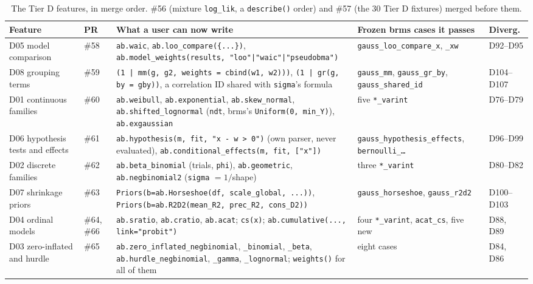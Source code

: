 \documentclass[11pt]{article}
\newcommand{\code}[1]{\texttt{#1}}
\begin{document}
\begin{table}[tbp]
\small
\begin{center}\begin{tabular}{@{}>{\raggedright\arraybackslash}p{}>{\raggedright\arraybackslash}p{}>{\raggedright\arraybackslash}p{}>{\raggedright\arraybackslash}p{}>{\raggedright\arraybackslash}p{}@{}}
\toprule
Feature & PR & What a user can now write & Frozen brms cases it passes & Diverg. \\
\midrule
D05 model comparison & \#58 & \code{ab.waic}, \code{ab.loo\_compare(\{...\})}, \code{ab.model\_weights(results, "loo"|"waic"|"pseudobma")} & \code{gauss\_\allowbreak{}loo\_\allowbreak{}compare\_\allowbreak{}x}, \code{\_xw} & D92--D95 \\
D08 grouping terms & \#59 & \code{(1 | mm(g, g2, weights = cbind(w1, w2)))}, \code{(1 | gr(g, by = gby))}, a correlation ID shared with \code{sigma}'s formula & \code{gauss\_\allowbreak{}mm}, \code{gauss\_\allowbreak{}gr\_\allowbreak{}by}, \code{gauss\_\allowbreak{}shared\_\allowbreak{}id} & D104--D107 \\
D01 continuous families & \#60 & \code{ab.weibull}, \code{ab.exponential}, \code{ab.skew\_normal}, \code{ab.shifted\_lognormal} (\code{ndt}, brms's \code{Uniform(0, min\_Y)}), \code{ab.exgaussian} & five \code{*\_varint} & D76--D79 \\
D06 hypothesis tests and effects & \#61 & \code{ab.hypothesis(m, fit, "x - w > 0")} (own parser, never evaluated), \code{ab.conditional\_effects(m, fit, ["x"])} & \code{gauss\_\allowbreak{}hypothesis\_\allowbreak{}effects}, \code{bernoulli\_\ldots} & D96--D99 \\
D02 discrete families & \#62 & \code{ab.beta\_binomial} (trials, \code{phi}), \code{ab.geometric}, \code{ab.negbinomial2} (\code{sigma} $= 1/$shape) & three \code{*\_varint} & D80--D82 \\
D07 shrinkage priors & \#63 & \code{Priors(b=ab.Horseshoe(df, scale\_global, ...))}, \code{Priors(b=ab.R2D2(mean\_R2, prec\_R2, cons\_D2))} & \code{gauss\_\allowbreak{}horseshoe}, \code{gauss\_\allowbreak{}r2d2} & D100--D103 \\
D04 ordinal models & \#64, \#66 & \code{ab.sratio}, \code{ab.cratio}, \code{ab.acat}; \code{cs(x)}; \code{ab.cumulative(..., link="probit")} & four \code{*\_varint}, \code{acat\_cs}, five new & D88, D89 \\
D03 zero-inflated and hurdle & \#65 & \code{ab.zero\_inflated\_negbinomial}, \code{\_binomial}, \code{\_beta}, \code{ab.hurdle\_negbinomial}, \code{\_gamma}, \code{\_lognormal}; \code{weights()} for all of them & eight cases & D84, D86 \\
\bottomrule
\end{tabular}\end{center}
\caption{\small The Tier D features, in merge order. \#56 (mixture \code{log\_lik}, a \code{describe()} order) and \#57 (the
30 Tier D fixtures) merged before them.}\label{tab:built}
\end{table}
\end{document}
